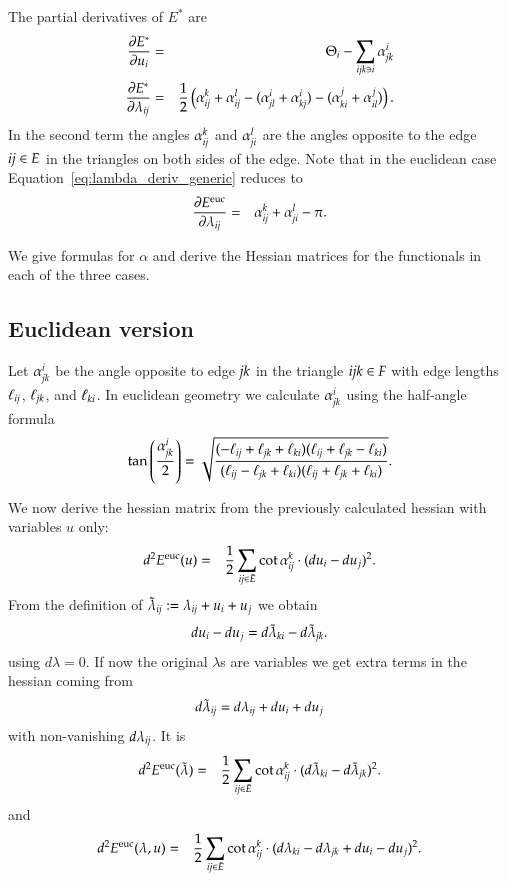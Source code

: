 \documentclass[Thesis]{subfiles}
\begin{document}
The partial derivatives of $E^*$ are
\begin{eqnarray}
	\frac{\partial E^*}{\partial u_i} &=& \Theta_i - \sum_{\it ijk\ni i}\alpha_{\it jk}^i \\
	\frac{\partial E^*}{\partial \lambda_{\it ij}} &=& \frac{1}{2}\left(\alpha_{\it ij}^k + \alpha_{\it ij}^l - (\alpha^i_{\it jl} + \alpha^i_{\it kj}) - (\alpha^j_{\it ki} + \alpha^j_{\it il})\right).\label{eq:lambda_deriv_generic}
\end{eqnarray}
In the second term the angles $\alpha_{\it ij}^k$ and $\alpha_{\it ji}^l$ are the angles opposite to the edge $\it ij\in E$ in the 
triangles on both sides of the edge. Note that in the euclidean case Equation~\ref{eq:lambda_deriv_generic} reduces to
\begin{eqnarray}
	\frac{\partial E^{\rm euc}}{\partial \lambda_{\it ij}} &=& \alpha_{\it ij}^k + \alpha_{\it ji}^l - \pi.\label{eq:lambda_deriv_euc}
\end{eqnarray}

We give formulas for $\alpha$ and derive the Hessian matrices for the functionals in each of the three cases.

\subsection{Euclidean version}
\label{sec:euclidean_fuctional}

Let $\alpha^i_{\it jk}$ be the angle opposite to edge $\it jk$ in the triangle $\it ijk\in F$ with edge lengths $\ell_{\it ij}$, $\ell_{\it jk}$, and $\ell_{\it ki}$. In euclidean geometry we calculate $\alpha^i_{\it jk}$ using the half-angle formula
\[\tan\left(\frac{ \alpha_{\it jk}^i}{2}\right) = \sqrt{\frac
{(-\ell_{\it ij} +\ell_{\it jk} +\ell_{\it ki})(\ell_{\it ij} +\ell_{\it jk} -\ell_{\it ki})}
{(\ell_{\it ij} -\ell_{\it jk} +\ell_{\it ki})(\ell_{\it ij} + \ell_{\it jk} +\ell_{\it ki})}}.\]

We now derive the hessian matrix from the previously calculated hessian with variables $u$ only:
\begin{eqnarray}
d^2E^{\rm euc}(u)&=&\frac{1}{2}\sum_{\it ij \in \bar E} \cot  \alpha_{\it ij}^k \cdot (du_i - du_j)^2.
\end{eqnarray}
From the definition of $\tilde\lambda_{\it ij} := \lambda_{\it ij}+u_i+u_j$ we obtain
\[du_i-du_j=d\tilde\lambda_{\it ki}-d\tilde\lambda_{\it jk}.\]
using $d\lambda = 0$. If now the original $\lambda$s are variables we get extra terms in the hessian coming from 
\[d\tilde\lambda_{\it ij}=d\lambda_{\it ij}+du_i+du_j\]
with non-vanishing $d\lambda_{\it ij}$. It is
\begin{eqnarray*}
d^2E^{\rm euc}(\tilde\lambda)
&=&\frac{1}{2}\sum_{\it ij \in \bar E} \cot  \alpha_{\it ij}^k \cdot (d\tilde\lambda_{\it ki}-d\tilde\lambda_{\it jk})^2.
\end{eqnarray*}
and
\begin{eqnarray*}
d^2E^{\rm euc}(\lambda, u)&=&\frac{1}{2}\sum_{\it ij \in \bar E} \cot  \alpha_{\it ij}^k \cdot (d\lambda_{\it ki}-d\lambda_{\it jk} + du_i - du_j)^2.
\end{eqnarray*}
\end{document}

